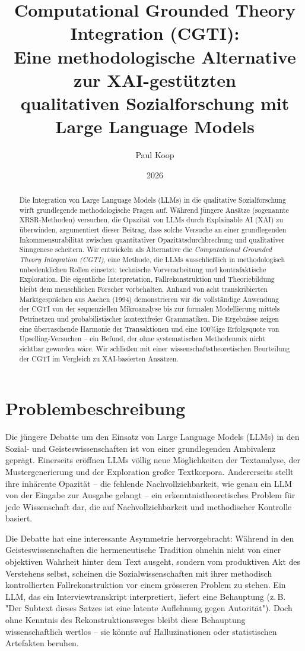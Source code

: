 \documentclass[12pt,a4paper]{article}
\title{Computational Grounded Theory Integration (CGTI):\\
Eine methodologische Alternative zur XAI-gestützten\\
qualitativen Sozialforschung mit Large Language Models}
\author{
  \large
  \begin{tabular}{c}
    Paul Koop
  \end{tabular}
}
\date{\large 2026}
\begin{document}
\maketitle

\begin{abstract}
Die Integration von Large Language Models (LLMs) in die qualitative Sozialforschung wirft grundlegende methodologische Fragen auf. Während jüngere Ansätze (sogenannte XRSR-Methoden) versuchen, die Opazität von LLMs durch Explainable AI (XAI) zu überwinden, argumentiert dieser Beitrag, dass solche Versuche an einer grundlegenden Inkommensurabilität zwischen quantitativer Opazitätsdurchbrechung und qualitativer Sinngenese scheitern. Wir entwickeln als Alternative die \textit{Computational Grounded Theory Integration (CGTI)}, eine Methode, die LLMs ausschließlich in methodologisch unbedenklichen Rollen einsetzt: technische Vorverarbeitung und kontrafaktische Exploration. Die eigentliche Interpretation, Fallrekonstruktion und Theoriebildung bleibt dem menschlichen Forscher vorbehalten. Anhand von acht transkribierten Marktgesprächen aus Aachen (1994) demonstrieren wir die vollständige Anwendung der CGTI von der sequenziellen Mikroanalyse bis zur formalen Modellierung mittels Petrinetzen und probabilistischer kontextfreier Grammatiken. Die Ergebnisse zeigen eine überraschende Harmonie der Transaktionen und eine 100\%ige Erfolgsquote von Upselling-Versuchen – ein Befund, der ohne systematischen Methodenmix nicht sichtbar geworden wäre. Wir schließen mit einer wissenschaftstheoretischen Beurteilung der CGTI im Vergleich zu XAI-basierten Ansätzen.
\end{abstract}

\section{Problembeschreibung}

Die jüngere Debatte um den Einsatz von Large Language Models (LLMs) in den Sozial- und Geisteswissenschaften ist von einer grundlegenden Ambivalenz geprägt. Einerseits eröffnen LLMs völlig neue Möglichkeiten der Textanalyse, der Mustergenerierung und der Exploration großer Textkorpora. Andererseits stellt ihre inhärente Opazität – die fehlende Nachvollziehbarkeit, wie genau ein LLM von der Eingabe zur Ausgabe gelangt – ein erkenntnistheoretisches Problem für jede Wissenschaft dar, die auf Nachvollziehbarkeit und methodischer Kontrolle basiert.

Die Debatte hat eine interessante Asymmetrie hervorgebracht: Während in den Geisteswissenschaften die hermeneutische Tradition ohnehin nicht von einer objektiven Wahrheit hinter dem Text ausgeht, sondern vom produktiven Akt des Verstehens selbst, scheinen die Sozialwissenschaften mit ihrer methodisch kontrollierten Fallrekonstruktion vor einem grösseren Problem zu stehen. Ein LLM, das ein Interviewtranskript interpretiert, liefert eine Behauptung (z. B. "Der Subtext dieses Satzes ist eine latente Auflehnung gegen Autorität"). Doch ohne Kenntnis des Rekonstruktionsweges bleibt diese Behauptung wissenschaftlich wertlos – sie könnte auf Halluzinationen oder statistischen Artefakten beruhen.
\end{document}
